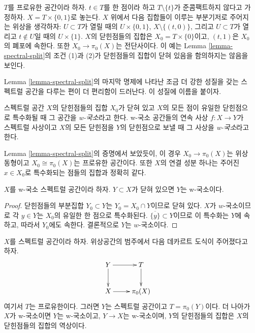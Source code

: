 \begin{example}
\label{example-not-w-local}
$T$를 프로유한 공간이라 하자. $t \in T$를 한 점이라 하고
$T \setminus \{t\}$가 준콤팩트하지 않다고 가정하자.
$X = T \times \{0, 1\}$로 놓는다. $X$ 위에서 다음 집합들이 이루는
부분기저로 주어지는 위상을 생각하자:
$U \subset T$가 열릴 때의 $U \times \{0, 1\}$,
$X \setminus \{(t, 0)\}$, 그리고 $U \subset T$가 열리고
$t \not \in U$일 때의 $U \times \{1\}$.
$X$의 닫힌점들의 집합은 $X_0 = T \times \{0\}$이고,
$(t, 1)$은 $X_0$의 폐포에 속한다.
또한 $X_0 \to \pi_0(X)$는 전단사이다.
이 예는 Lemma \ref{lemma-spectral-split}의 조건 (1)과 (2)가
닫힌점들의 집합이 닫혀 있음을 함의하지는 않음을 보인다.
\end{example}

\noindent
Lemma \ref{lemma-spectral-split}의 마지막 명제에 나타난
조금 더 강한 성질을 갖는 스펙트럴 공간을 다루는 편이
더 편리함이 드러난다. 이 성질에 이름을 붙이자.

\begin{definition}
\label{definition-w-local}
스펙트럴 공간 $X$의 닫힌점들의 집합 $X_0$가 닫혀 있고
$X$의 모든 점이 유일한 닫힌점으로 특수화될 때
그 공간을 {\it w-국소}라고 한다.
w-국소 공간들의 연속 사상 $f : X \to Y$가 스펙트럴 사상이고
$X$의 모든 닫힌점을 $Y$의 닫힌점으로 보낼 때
그 사상을 {\it w-국소}라고 한다.
\end{definition}

\noindent
Lemma \ref{lemma-spectral-split}의 증명에서 보았듯이, 이 경우
$X_0 \to \pi_0(X)$는 위상동형이고
$X_0 \cong \pi_0(X)$는 프로유한 공간이다.
또한 $X$의 연결 성분 하나는 주어진 $x \in X_0$로
특수화되는 점들의 집합과 정확히 같다.

\begin{lemma}
\label{lemma-closed-subspace-w-local}
$X$를 w-국소 스펙트럴 공간이라 하자.
$Y \subset X$가 닫혀 있으면 $Y$는 w-국소이다.
\end{lemma}

\begin{proof}
닫힌점들의 부분집합 $Y_0 \subset Y$는 $Y_0 = X_0 \cap Y$이므로 닫혀 있다.
$X$가 $w$-국소이므로 각 $y \in Y$는 $X_0$의 유일한 한 점으로 특수화된다.
$\overline{\{y\}}\subset Y$이므로 이 특수화는 $Y$에 속하고,
따라서 $Y_0$에도 속한다. 결론적으로 $Y$는 $w$-국소이다.
\end{proof}

\begin{lemma}
\label{lemma-silly}
$X$를 스펙트럴 공간이라 하자. 위상공간의 범주에서
다음 데카르트 도식이 주어졌다고 하자.
$$
\xymatrix{
Y \ar[r] \ar[d] & T \ar[d] \\
X \ar[r] & \pi_0(X)
}
$$
여기서 $T$는 프로유한이다. 그러면 $Y$는 스펙트럴 공간이고
$T = \pi_0(Y)$이다.
더 나아가 $X$가 w-국소이면 $Y$는 w-국소이고,
$Y \to X$는 w-국소이며, $Y$의 닫힌점들의 집합은
$X$의 닫힌점들의 집합의 역상이다.
\end{lemma}

